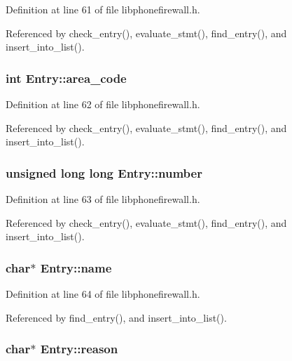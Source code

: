 Definition at line 61 of file libphonefirewall.h.

Referenced by check\_\-entry(), evaluate\_\-stmt(), find\_\-entry(), and insert\_\-into\_\-list().\hypertarget{structEntry_9de7b96e5b65796bd35e9dc730dcd8b3}{
\subsubsection{\setlength{\rightskip}{0pt plus 5cm}int {\bf Entry::area\_\-code}}}
\label{structEntry_9de7b96e5b65796bd35e9dc730dcd8b3}




Definition at line 62 of file libphonefirewall.h.

Referenced by check\_\-entry(), evaluate\_\-stmt(), find\_\-entry(), and insert\_\-into\_\-list().\hypertarget{structEntry_1f2177afed89936f82c130ae13fb107c}{
\subsubsection{\setlength{\rightskip}{0pt plus 5cm}unsigned long long {\bf Entry::number}}}
\label{structEntry_1f2177afed89936f82c130ae13fb107c}




Definition at line 63 of file libphonefirewall.h.

Referenced by check\_\-entry(), evaluate\_\-stmt(), find\_\-entry(), and insert\_\-into\_\-list().\hypertarget{structEntry_272e382d3efed5f970c7939742ec9603}{
\subsubsection{\setlength{\rightskip}{0pt plus 5cm}char$\ast$ {\bf Entry::name}}}
\label{structEntry_272e382d3efed5f970c7939742ec9603}




Definition at line 64 of file libphonefirewall.h.

Referenced by find\_\-entry(), and insert\_\-into\_\-list().\hypertarget{structEntry_2082cdbb815dfa8b81309cd395d32986}{
\subsubsection{\setlength{\rightskip}{0pt plus 5cm}char$\ast$ {\bf Entry::reason}}}
\label{structEntry_2082cdbb815dfa8b81309cd395d32986}




